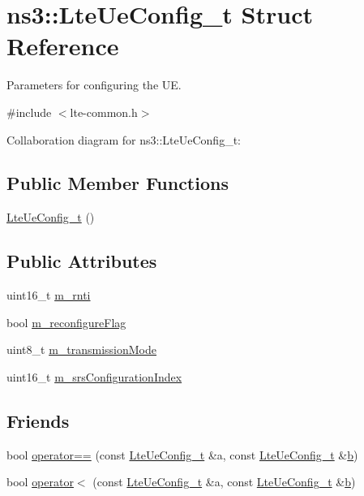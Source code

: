 \hypertarget{structns3_1_1LteUeConfig__t}{}\section{ns3\+:\+:Lte\+Ue\+Config\+\_\+t Struct Reference}
\label{structns3_1_1LteUeConfig__t}


Parameters for configuring the UE.  




{\ttfamily \#include $<$lte-\/common.\+h$>$}



Collaboration diagram for ns3\+:\+:Lte\+Ue\+Config\+\_\+t\+:
\subsection*{Public Member Functions}
\begin{DoxyCompactItemize}
\item 
\hyperlink{structns3_1_1LteUeConfig__t_a63c1348e92721849fb0f6ffadb8c947e}{Lte\+Ue\+Config\+\_\+t} ()
\end{DoxyCompactItemize}
\subsection*{Public Attributes}
\begin{DoxyCompactItemize}
\item 
uint16\+\_\+t \hyperlink{structns3_1_1LteUeConfig__t_acba18d5f8ffa2d57965463f040a11ce3}{m\+\_\+rnti}
\item 
bool \hyperlink{structns3_1_1LteUeConfig__t_a5be7e9afc4137c5bc553734a47a8b84c}{m\+\_\+reconfigure\+Flag}
\item 
uint8\+\_\+t \hyperlink{structns3_1_1LteUeConfig__t_af9fdece658d006d7f6d69819fe40f42b}{m\+\_\+transmission\+Mode}
\item 
uint16\+\_\+t \hyperlink{structns3_1_1LteUeConfig__t_a600c359ff7f96077be5ff3688efa6fba}{m\+\_\+srs\+Configuration\+Index}
\end{DoxyCompactItemize}
\subsection*{Friends}
\begin{DoxyCompactItemize}
\item 
bool \hyperlink{structns3_1_1LteUeConfig__t_a1b0e2627f17e9dcbf4c919f2b83049bb}{operator==} (const \hyperlink{structns3_1_1LteUeConfig__t}{Lte\+Ue\+Config\+\_\+t} \&a, const \hyperlink{structns3_1_1LteUeConfig__t}{Lte\+Ue\+Config\+\_\+t} \&\hyperlink{lte__pathloss_8m_a21ad0bd836b90d08f4cf640b4c298e7c}{b})
\item 
bool \hyperlink{structns3_1_1LteUeConfig__t_aaa48aeca3cfe3f58c5a3bf5ee9cd4c25}{operator$<$} (const \hyperlink{structns3_1_1LteUeConfig__t}{Lte\+Ue\+Config\+\_\+t} \&a, const \hyperlink{structns3_1_1LteUeConfig__t}{Lte\+Ue\+Config\+\_\+t} \&\hyperlink{lte__pathloss_8m_a21ad0bd836b90d08f4cf640b4c298e7c}{b})
\end{DoxyCompactItemize}


